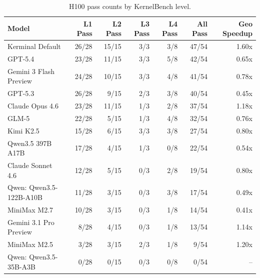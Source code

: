 \begin{table}[t]
\centering
\small
\caption{H100 pass counts by KernelBench level.}
\label{tab:h100-level-pass}
\begin{tabular}{lrrrrrr}
\toprule
Model & L1 Pass & L2 Pass & L3 Pass & L4 Pass & All Pass & Geo Speedup \\
\midrule
Kerminal Default & 26/28 & 15/15 & 3/3 & 3/8 & 47/54 & 1.60x \\
GPT-5.4 & 23/28 & 11/15 & 3/3 & 5/8 & 42/54 & 0.65x \\
Gemini 3 Flash Preview & 24/28 & 10/15 & 3/3 & 4/8 & 41/54 & 0.78x \\
GPT-5.3 & 26/28 & 9/15 & 2/3 & 3/8 & 40/54 & 0.45x \\
Claude Opus 4.6 & 23/28 & 11/15 & 1/3 & 2/8 & 37/54 & 1.18x \\
GLM-5 & 22/28 & 5/15 & 1/3 & 4/8 & 32/54 & 0.76x \\
Kimi K2.5 & 15/28 & 6/15 & 3/3 & 3/8 & 27/54 & 0.80x \\
Qwen3.5 397B A17B & 17/28 & 4/15 & 1/3 & 0/8 & 22/54 & 0.54x \\
Claude Sonnet 4.6 & 12/28 & 5/15 & 0/3 & 2/8 & 19/54 & 0.80x \\
Qwen: Qwen3.5-122B-A10B & 11/28 & 3/15 & 0/3 & 3/8 & 17/54 & 0.49x \\
MiniMax M2.7 & 10/28 & 3/15 & 0/3 & 1/8 & 14/54 & 0.41x \\
Gemini 3.1 Pro Preview & 8/28 & 4/15 & 0/3 & 1/8 & 13/54 & 1.14x \\
MiniMax M2.5 & 3/28 & 3/15 & 2/3 & 1/8 & 9/54 & 1.20x \\
Qwen: Qwen3.5-35B-A3B & 0/28 & 0/15 & 0/3 & 0/8 & 0/54 & -- \\
\bottomrule
\end{tabular}
\end{table}
